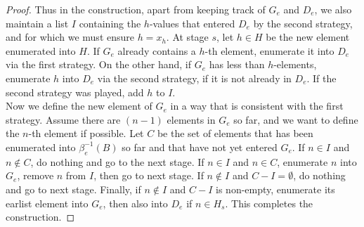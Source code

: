 \begin{proof}
  Thus in the construction, apart from keeping track of $G_e$ and $D_e$, we
  also maintain a list $I$ containing the $h$-values that entered $D_e$ by
  the second strategy, and for which we must ensure $h=x_h$. At stage $s$,
  let $h\in H$ be the new element enumerated into $H$. If $G_e$ already
  contains a $h$-th element, enumerate it into $D_e$ via the first
  strategy. On the other hand, if $G_e$ has less than $h$-elements,
  enumerate $h$ into $D_e$ via the second strategy, if it is not already in
  $D_e$. If the second strategy was played, add $h$ to $I$.\\

  Now we define the new element of $G_e$ in a way that is consistent with
  the first strategy. Assume there are $(n-1)$ elements in $G_e$ so far,
  and we want to define the $n$-th element if possible. Let $C$ be the set
  of elements that has been enumerated into $\beta_e^{-1}(B)$ so far and
  that have not yet entered $G_e$. If $n\in I$ and $n\not\in C$, do nothing
  and go to the next stage. If $n\in I$ and $n\in C$, enumerate $n$ into
  $G_e$, remove $n$ from $I$, then go to next stage. If $n\not\in I$ and
  $C-I=\emptyset$, do nothing and go to next stage. Finally, if $n\not\in
  I$ and $C-I$ is non-empty, enumerate its earlist element into $G_e$, then
  also into $D_e$ if $n\in H_s$. This completes the construction.
\end{proof}
